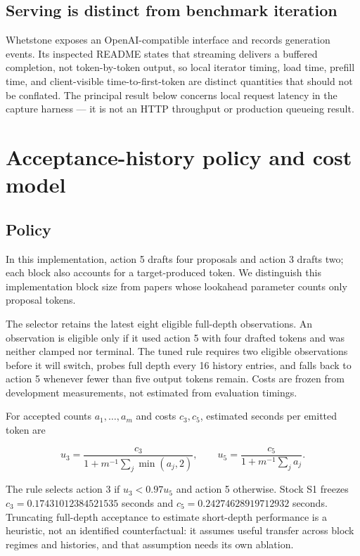 \documentclass[
  11pt,
]{article}
\begin{document}
\subsection{Serving is distinct from benchmark
iteration}\label{serving-is-distinct-from-benchmark-iteration}

Whetstone exposes an OpenAI-compatible interface and records generation
events. Its inspected README states that streaming delivers a buffered
completion, not token-by-token output, so local iterator timing, load
time, prefill time, and client-visible time-to-first-token are distinct
quantities that should not be conflated. The principal result below
concerns local request latency in the capture harness --- it is not an
HTTP throughput or production queueing result.

\section{Acceptance-history policy and cost
model}\label{acceptance-history-policy-and-cost-model}

\subsection{Policy}\label{policy}

In this implementation, action 5 drafts four proposals and action 3
drafts two; each block also accounts for a target-produced token. We
distinguish this implementation block size from papers whose lookahead
parameter counts only proposal tokens.

The selector retains the latest eight eligible full-depth observations.
An observation is eligible only if it used action 5 with four drafted
tokens and was neither clamped nor terminal. The tuned rule requires two
eligible observations before it will switch, probes full depth every 16
history entries, and falls back to action 5 whenever fewer than five
output tokens remain. Costs are frozen from development measurements,
not estimated from evaluation timings.

For accepted counts \(a_1,\ldots,a_m\) and costs \(c_3,c_5\), estimated
seconds per emitted token are

\[
u_3=\frac{c_3}{1+m^{-1}\sum_j\min(a_j,2)},\qquad
u_5=\frac{c_5}{1+m^{-1}\sum_j a_j}.
\]

The rule selects action 3 if \(u_3<0.97u_5\) and action 5 otherwise.
Stock S1 freezes \(c_3=0.17431012384521535\) seconds and
\(c_5=0.24274628919712932\) seconds. Truncating full-depth acceptance to
estimate short-depth performance is a heuristic, not an identified
counterfactual: it assumes useful transfer across block regimes and
histories, and that assumption needs its own ablation.
\end{document}
